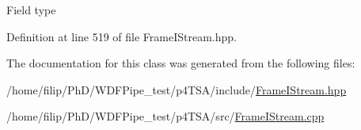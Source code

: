 Field type 

Definition at line 519 of file Frame\+I\+Stream.\+hpp.



The documentation for this class was generated from the following files\+:\begin{DoxyCompactItemize}
\item 
/home/filip/\+Ph\+D/\+W\+D\+F\+Pipe\+\_\+test/p4\+T\+S\+A/include/\hyperlink{_frame_i_stream_8hpp}{Frame\+I\+Stream.\+hpp}\item 
/home/filip/\+Ph\+D/\+W\+D\+F\+Pipe\+\_\+test/p4\+T\+S\+A/src/\hyperlink{_frame_i_stream_8cpp}{Frame\+I\+Stream.\+cpp}\end{DoxyCompactItemize}
